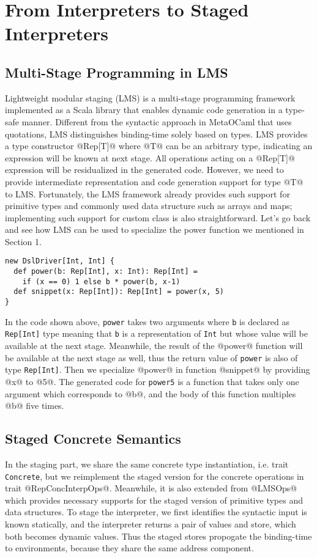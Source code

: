 \section{From Interpreters to Staged Interpreters} \label{stagedinterp}

\subsection{Multi-Stage Programming in LMS}
Lightweight modular staging (LMS) \cite{DBLP:conf/gpce/RompfO10} is a multi-stage programming framework implemented 
as a Scala library that enables dynamic code generation in a type-safe manner.
Different from the syntactic approach in MetaOCaml \cite{DBLP:conf/flops/Kiselyov14} that uses quotations, 
LMS distinguishes binding-time solely based on types.
LMS provides a type constructor @Rep[T]@ where @T@ can be an arbitrary type, indicating an expression will be 
known at next stage. All operations acting on a @Rep[T]@ expression will be residualized in the generated code. However,
we need to provide intermediate representation and code generation support for type @T@ to LMS. 
Fortunately, the LMS framework already provides
such support for primitive types and commonly used data structure such as arrays and maps; implementing such support
for custom class is also straightforward. Let's go back and see how LMS can be used to specialize the power function
we mentioned in Section 1.

\begin{lstlisting}
new DslDriver[Int, Int] {
  def power(b: Rep[Int], x: Int): Rep[Int] =
    if (x == 0) 1 else b * power(b, x-1)
  def snippet(x: Rep[Int]): Rep[Int] = power(x, 5)
}
\end{lstlisting}

In the code shown above, \texttt{power} takes two arguments where \texttt{b} is declared as \texttt{Rep[Int]} type 
meaning that \texttt{b} is a representation of \texttt{Int} but whose value will be available at the next stage. 
Meanwhile, the result of the @power@ function will be available at the next stage as well, thus the return value 
of \texttt{power} is also of type \texttt{Rep[Int]}. 
Then we specialize @power@ in function @snippet@ by providing @x@ to @5@.
The generated code for \texttt{power5} is a function that takes only one argument which corresponds to @b@,
and the body of this function multiples @b@ five times.

\subsection{Staged Concrete Semantics} 
In the staging part, we share the same concrete type instantiation, 
i.e. trait \texttt{Concrete}, but we reimplement the staged version for the concrete operations
in trait @RepConcInterpOps@.
Meanwhile, it is also extended from @LMSOps@ which provides necessary supports for the 
staged version of primitive types and data structures.
To stage the interpreter, we first identifies the syntactic input is known statically, 
and the interpreter returns a pair of values and store, which both becomes dynamic values.
Thus the staged stores propogate the binding-time to environments, because they share the same
address component. 

